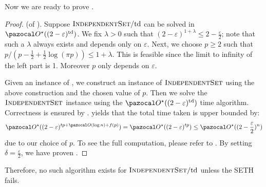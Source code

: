 

Now we are ready to prove .

\begin{proof}
    (of ). Suppose $\textsc{IndependentSet}/\text{td}$ can be solved in $\O^\star((2-\varepsilon)^\td)$. We fix $\lambda > 0$ such that $(2 - \varepsilon)^{1 + \lambda} \leq 2 - \frac{\varepsilon}{2}$; note that such a $\lambda$ always exists and depends only on $\varepsilon$. Next, we choose $p \geq 2$ such that $p/(p - \frac{1}{2} + \frac{1}{2}\log(\pi p)) \leq 1 + \lambda$. This is feasible since the limit to infinity of the left part is 1. Moreover $p$ only depends on $\varepsilon$. 
    
    Given an instance of , we construct an instance of $\textsc{IndependentSet}$ using the above construction and the chosen value of $p$. Then we solve the $\textsc{IndependentSet}$ instance using the $\O^\star((2 - \varepsilon)^\td)$ time algorithm. Correctness is ensured by .  yields that the total time taken is upper bounded by: $$\O^\star((2-\varepsilon)^{tp + \O(\log n) + f(p)}) = \O^\star((2-\varepsilon)^{tp}) \leq \O^\star((2-\frac{\varepsilon}{2})^{n})$$ due to our choice of $p$. To see the full computation, please refer to . By setting $\delta = \frac{\varepsilon}{2}$, we have proven .
\end{proof}

Therefore, no such algorithm exists for $\textsc{IndependentSet}/\text{td}$ unless the SETH fails.